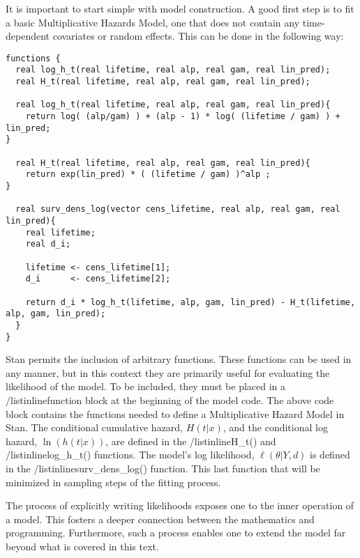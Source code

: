 It is important to start simple with model construction. A good first step is to fit a basic Multiplicative Hazards Model, one that does not contain any time-dependent covariates or random effects. This can be done in the following way:




\begin{lstlisting}
functions {
  real log_h_t(real lifetime, real alp, real gam, real lin_pred);
  real H_t(real lifetime, real alp, real gam, real lin_pred);

  real log_h_t(real lifetime, real alp, real gam, real lin_pred){
    return log( (alp/gam) ) + (alp - 1) * log( (lifetime / gam) ) + lin_pred;
}

  real H_t(real lifetime, real alp, real gam, real lin_pred){
    return exp(lin_pred) * ( (lifetime / gam) )^alp ;
}

  real surv_dens_log(vector cens_lifetime, real alp, real gam, real lin_pred){
    real lifetime;
    real d_i;
  
    lifetime <- cens_lifetime[1];
    d_i      <- cens_lifetime[2];
    
    return d_i * log_h_t(lifetime, alp, gam, lin_pred) - H_t(lifetime, alp, gam, lin_pred);
  }
}
\end{lstlisting}


Stan permits the inclusion of arbitrary functions. These functions can be used in any manner, but in this context they are primarily useful for evaluating the likelihood of the model. To be included, they must be placed in a /listinline{function} block at the beginning of the model code. The above code block contains the functions needed to define a Multiplicative Hazard Model in Stan. The conditional cumulative hazard, $H(t|x)$, and the conditional log hazard, $\ln(h(t|x))$, are defined in the /listinline{H\_t()} and /listinline{log\_h\_t()} functions. The model's log likelihood, $\ell(\theta|Y, d)$ is defined in the /listinline{surv\_dens\_log()} function. This last function that will be minimized in sampling steps of the fitting process. 

The process of explicitly writing likelihoods exposes one to the inner operation of a model. This fosters a deeper connection between the mathematics and programming. Furthermore, such a process enables one to extend the model far beyond what is covered in this text.

